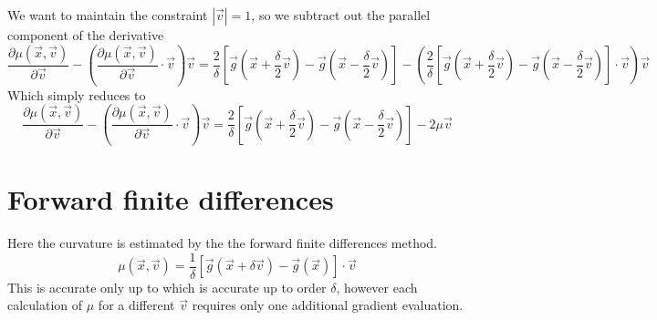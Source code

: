 \documentclass[a4paper]{article}
\begin{document}
We want to maintain the constraint $\left|\vec{v} \right| = 1$, so we subtract out the parallel component of the derivative
\begin{equation}
\frac{\partial \mu(\vec{x}, \vec{v})} {\partial \vec{v}} - 
\left(
\frac{\partial \mu(\vec{x}, \vec{v})} {\partial \vec{v}} \cdot \vec{v}
\right) \vec{v}
= 
\frac{2}{\delta} 
\left[ \vec{g}(\vec{x} + \frac{\delta}{2} \vec{v}) 
- \vec{g}(\vec{x} - \frac{\delta}{2} \vec{v}) \right]
-
\left(
\frac{2}{\delta} 
\left[ \vec{g}(\vec{x} + \frac{\delta}{2} \vec{v}) 
-\vec{g}(\vec{x} - \frac{\delta}{2} \vec{v}) \right] \cdot \vec{v}
\right)
\vec{v}
\end{equation}
Which simply reduces to 
\begin{equation}
\frac{\partial \mu(\vec{x}, \vec{v})} {\partial \vec{v}} - 
\left(
\frac{\partial \mu(\vec{x}, \vec{v})} {\partial \vec{v}} \cdot \vec{v}
\right) \vec{v}
= 
\frac{2}{\delta} 
\left[ \vec{g}(\vec{x} + \frac{\delta}{2} \vec{v}) 
- \vec{g}(\vec{x} - \frac{\delta}{2} \vec{v}) \right]
-
2 \mu \vec{v}
\end{equation}


\section{Forward finite differences}
Here the curvature
is estimated by the the forward finite differences method.
\begin{equation}
\mu(\vec{x}, \vec{v}) = \frac{1}{\delta} 
\left[ \vec{g}(\vec{x} + \delta \vec{v}) - 
\vec{g}(\vec{x}) \right] \cdot \vec{v}
\end{equation}
This is accurate only up to which is accurate up to
order $\delta$, however each calculation of $\mu$ for a different $\vec{v}$ requires
only one additional gradient evaluation.   
\end{document}
